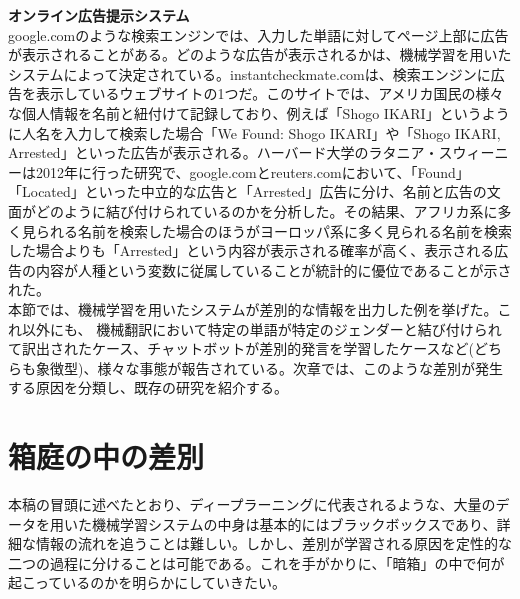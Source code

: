 \documentclass[b5j,twoside,twocolumn]{utarticle}
\begin{document}
\textbf{オンライン広告提示システム}\\
google.comのような検索エンジンでは、入力した単語に対してページ上部に広告が表示されることがある。どのような広告が表示されるかは、機械学習を用いたシステムによって決定されている。instantcheckmate.comは、検索エンジンに広告を表示しているウェブサイトの1つだ。このサイトでは、アメリカ国民の様々な個人情報を名前と紐付けて記録しており、例えば「Shogo IKARI」というように人名を入力して検索した場合「We Found: Shogo IKARI」や「Shogo IKARI, Arrested」といった広告が表示される。ハーバード大学のラタニア・スウィーニーは2012年に行った研究で、google.comとreuters.comにおいて、「Found」「Located」といった中立的な広告と「Arrested」広告に分け、名前と広告の文面がどのように結び付けられているのかを分析した。その結果、アフリカ系に多く見られる名前を検索した場合のほうがヨーロッパ系に多く見られる名前を検索した場合よりも「Arrested」という内容が表示される確率が高く、表示される広告の内容が人種という変数に従属していることが統計的に優位であることが示された。\\

本節では、機械学習を用いたシステムが差別的な情報を出力した例を挙げた。これ以外にも、
機械翻訳において特定の単語が特定のジェンダーと結び付けられて訳出されたケース、チャットボットが差別的発言を学習したケースなど(どちらも象徴型)、様々な事態が報告されている。次章では、このような差別が発生する原因を分類し、既存の研究を紹介する。
\section{箱庭の中の差別}
本稿の冒頭に述べたとおり、ディープラーニングに代表されるような、大量のデータを用いた機械学習システムの中身は基本的にはブラックボックスであり、詳細な情報の流れを追うことは難しい。しかし、差別が学習される原因を定性的な二つの過程に分けることは可能である。これを手がかりに、「暗箱」の中で何が起こっているのかを明らかにしていきたい。
\end{document}
